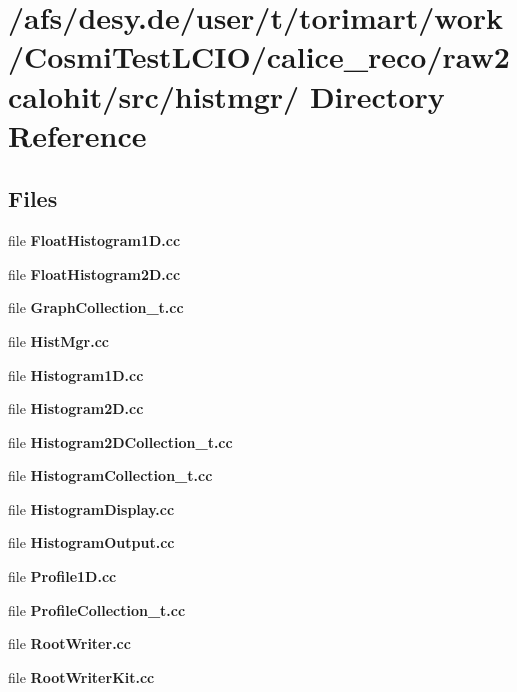 \section{/afs/desy.de/user/t/torimart/work/CosmiTestLCIO/calice\_\-reco/raw2calohit/src/histmgr/ Directory Reference}
\label{dir_4057a166b0f433e98c02d53cc066462a}
\subsection*{Files}
\begin{DoxyCompactItemize}
\item 
file {\bfseries FloatHistogram1D.cc}
\item 
file {\bfseries FloatHistogram2D.cc}
\item 
file {\bfseries GraphCollection\_\-t.cc}
\item 
file {\bfseries HistMgr.cc}
\item 
file {\bfseries Histogram1D.cc}
\item 
file {\bfseries Histogram2D.cc}
\item 
file {\bfseries Histogram2DCollection\_\-t.cc}
\item 
file {\bfseries HistogramCollection\_\-t.cc}
\item 
file {\bfseries HistogramDisplay.cc}
\item 
file {\bfseries HistogramOutput.cc}
\item 
file {\bfseries Profile1D.cc}
\item 
file {\bfseries ProfileCollection\_\-t.cc}
\item 
file {\bfseries RootWriter.cc}
\item 
file {\bfseries RootWriterKit.cc}
\end{DoxyCompactItemize}
